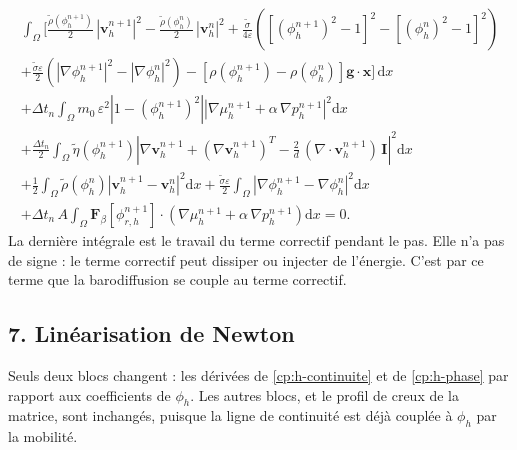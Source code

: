 \begin{multline}\label{cp:energie-discrete}
  \int_{\Omega} \Bigg[
    \frac{\tilde{\rho}(\phi_h^{n+1})}{2}\,\left|\mathbf{v}_h^{n+1}\right|^{2}
    - \frac{\tilde{\rho}(\phi_h^{n})}{2}\,\left|\mathbf{v}_h^{n}\right|^{2}
    + \frac{\tilde{\sigma}}{4\varepsilon}\left(\left[(\phi_h^{n+1})^{2}-1\right]^{2}
      - \left[(\phi_h^{n})^{2}-1\right]^{2}\right)\\
    + \frac{\tilde{\sigma}\varepsilon}{2}\left(\left|\nabla\phi_h^{n+1}\right|^{2}
      - \left|\nabla\phi_h^{n}\right|^{2}\right)
    - \left[\rho(\phi_h^{n+1}) - \rho(\phi_h^{n})\right]\mathbf{g}\cdot\mathbf{x}
  \Bigg]\,\mathrm{d}x\\
  + \Delta t_n \int_{\Omega} m_0\,\varepsilon^{2}\left|1-(\phi_h^{n+1})^{2}\right|
    \left|\nabla\mu_h^{n+1} + \alpha\,\nabla p_h^{n+1}\right|^{2}\mathrm{d}x\\
  + \frac{\Delta t_n}{2}\int_{\Omega} \tilde{\eta}(\phi_h^{n+1})
    \left|\nabla\mathbf{v}_h^{n+1} + (\nabla\mathbf{v}_h^{n+1})^{T}
    - \frac{2}{d}\,(\nabla\cdot\mathbf{v}_h^{n+1})\,\mathbf{I}\right|^{2}\mathrm{d}x\\
  + \frac{1}{2}\int_{\Omega} \tilde{\rho}(\phi_h^{n})\left|\mathbf{v}_h^{n+1}-\mathbf{v}_h^{n}\right|^{2}\mathrm{d}x
  + \frac{\tilde{\sigma}\varepsilon}{2}\int_{\Omega}\left|\nabla\phi_h^{n+1}-\nabla\phi_h^{n}\right|^{2}\mathrm{d}x\\
  + \Delta t_n\,A\int_{\Omega}\mathbf{F}_\beta[\phi_{r,h}^{n+1}]\cdot
    \left(\nabla\mu_h^{n+1} + \alpha\,\nabla p_h^{n+1}\right)\mathrm{d}x = 0 .
\end{multline}
La dernière intégrale est le travail du terme correctif pendant le pas. Elle n'a pas de signe : le terme correctif peut dissiper ou injecter de l'énergie. C'est par ce terme que la barodiffusion se couple au terme correctif.

\subsection*{7. Linéarisation de Newton}

Seuls deux blocs changent : les dérivées de \eqref{cp:h-continuite} et de \eqref{cp:h-phase} par rapport aux coefficients de $\phi_h$. Les autres blocs, et le profil de creux de la matrice, sont inchangés, puisque la ligne de continuité est déjà couplée à $\phi_h$ par la mobilité.

